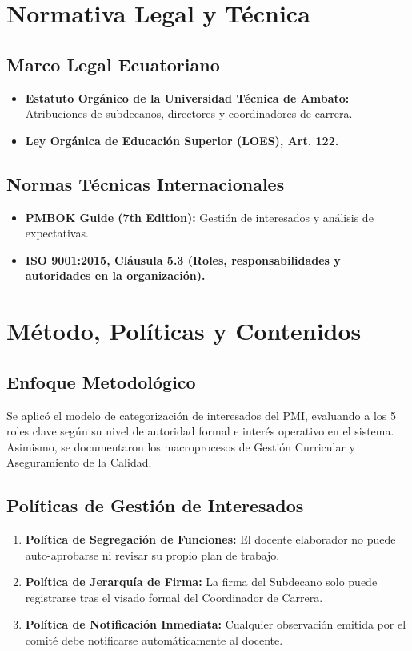 \documentclass[12pt,a4paper]{article}
\begin{document}
\section{Normativa Legal y Técnica}
\subsection{Marco Legal Ecuatoriano}
\begin{itemize}[leftmargin=1.5em, itemsep=2pt]
    \item \textbf{Estatuto Orgánico de la Universidad Técnica de Ambato:} Atribuciones de subdecanos, directores y coordinadores de carrera.
    \item \textbf{Ley Orgánica de Educación Superior (LOES), Art. 122.}
\end{itemize}
\subsection{Normas Técnicas Internacionales}
\begin{itemize}[leftmargin=1.5em, itemsep=2pt]
    \item \textbf{PMBOK Guide (7th Edition):} Gestión de interesados y análisis de expectativas.
    \item \textbf{ISO 9001:2015, Cláusula 5.3 (Roles, responsabilidades y autoridades en la organización).}
\end{itemize}

\section{Método, Políticas y Contenidos}
\subsection{Enfoque Metodológico}
Se aplicó el modelo de categorización de interesados del PMI, evaluando a los 5 roles clave según su nivel de autoridad formal e interés operativo en el sistema. Asimismo, se documentaron los macroprocesos de Gestión Curricular y Aseguramiento de la Calidad.

\subsection{Políticas de Gestión de Interesados}
\begin{enumerate}[leftmargin=1.5em, itemsep=2pt]
    \item \textbf{Política de Segregación de Funciones:} El docente elaborador no puede auto-aprobarse ni revisar su propio plan de trabajo.
    \item \textbf{Política de Jerarquía de Firma:} La firma del Subdecano solo puede registrarse tras el visado formal del Coordinador de Carrera.
    \item \textbf{Política de Notificación Inmediata:} Cualquier observación emitida por el comité debe notificarse automáticamente al docente.
\end{enumerate}
\end{document}
